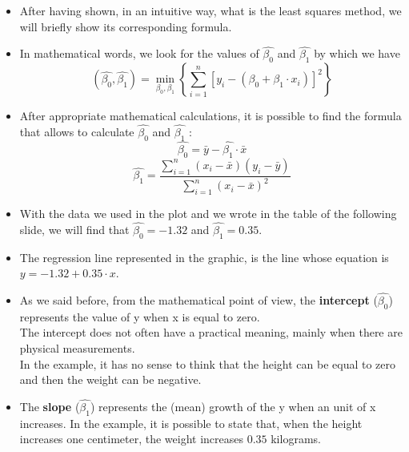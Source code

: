 \begin{frame}
  \vspace{0.25cm}
  \begin{itemize}
    \item After having shown, in an intuitive way, what is the least squares method, we will briefly show its corresponding formula.
    \vspace{0.15cm}
    \item In mathematical words, we look for the values of $ \hat{\beta_0} $ and $ \hat{\beta_1} $ by which we have
      \vspace{-0.3cm} $$ (\hat{\beta_0}, \hat{\beta_1}) = \min_{\beta_0, \beta_1}\left\lbrace \sum_{i=1}^{n}{\left[ y_i-\left(\beta_0 + \beta_1 \cdot x_i \right) \right] ^2 }\right\rbrace $$ \vspace{-0.4cm}
    \vspace{0.15cm}
    \item After appropriate mathematical calculations, it is possible to find the formula that allows to calculate $ \hat{\beta_0} $ and $ \hat{\beta_1} $ :
      \vspace{-0.2cm} $$ \hat{\beta_0} = \bar{y} - \hat{\beta_1} \cdot \bar{x} $$
      $$ \hat{\beta_1} = \frac{\sum_{i=1}^n (x_i - \bar{x}) (y_i - \bar{y})}{\sum_{i=1}^n (x_i - \bar{x})^2} $$
  \end{itemize}
\end{frame}

\begin{frame}[label=stimaMQ]
  \begin{itemize}
    \item With the data we used in the plot and we wrote in the table of the following slide, we will find that  $ \hat{\beta_0} = -1.32 $ and $ \hat{\beta_1} = 0.35 $.
    \item The regression line represented in the graphic, is the line whose equation is $ y = -1.32 + 0.35 \cdot x $.
    \item As we said before, from the mathematical point of view, the \textbf{intercept} ($ \hat{\beta_0} $) represents the value of y when x is equal to zero. \\ 
      The intercept does not often have a practical meaning, mainly when there are physical measurements. \\
      In the example, it has no sense to think that the height can be equal to zero and then the weight can be negative.
    \item The \textbf{slope} ($ \hat{\beta_1} $) represents the (mean) growth of the y when an unit of x increases. In the example, it is possible to state that, when the height increases one centimeter, the weight increases $ 0.35 $ kilograms.
  \end{itemize}
\end{frame}

